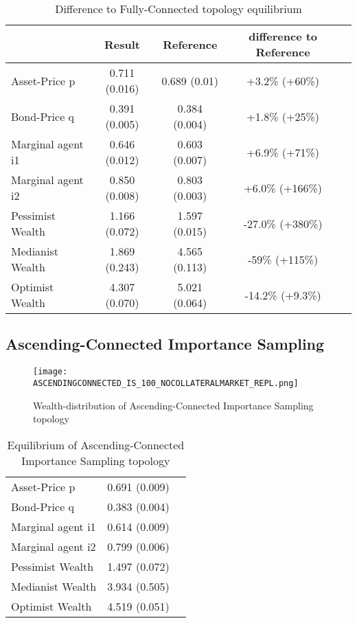 \documentclass[Bachelorarbeit.tex]{subfiles}
\begin{document}
\begin{table}[H]
	\caption{Difference to Fully-Connected topology equilibrium}
	\centering
	\begin{tabular} { l c c c r }
		& Result & Reference & difference to Reference \\
		\hline
		Asset-Price p & 0.711 (0.016) & 0.689 (0.01) & +3.2\% (+60\%) \\
		Bond-Price q & 0.391 (0.005) & 0.384 (0.004) & +1.8\% (+25\%) \\
		Marginal agent i1 & 0.646 (0.012) & 0.603 (0.007) & +6.9\% (+71\%) \\
		Marginal agent i2 & 0.850 (0.008) & 0.803 (0.003) & +6.0\% (+166\%) \\
		\hline
		Pessimist Wealth & 1.166 (0.072) & 1.597 (0.015) & -27.0\% (+380\%) \\
		Medianist Wealth & 1.869 (0.243) & 4.565 (0.113) & -59\% (+115\%) \\
		Optimist Wealth & 4.307 (0.070) & 5.021 (0.064) & -14.2\% (+9.3\%) \\
		\hline
	\end{tabular}
\end{table}

\subsection{Ascending-Connected Importance Sampling}
\begin{figure}[H]
	\centering
  \texttt{[image: ASCENDINGCONNECTED\_IS\_100\_NOCOLLATERALMARKET\_REPL.png]}
	\caption{Wealth-distribution of Ascending-Connected Importance Sampling topology}
	\label{fig:wealth_ASCENDINGCONNECTED_IS_100_NOCOLLATERALMARKET_REPL}
\end{figure}

\begin{table}[H]
	\caption{Equilibrium of Ascending-Connected Importance Sampling topology}
	\centering
	\begin{tabular} { l c r }
		\hline
		Asset-Price p & 0.691 (0.009) \\
		Bond-Price q & 0.383 (0.004) \\
		Marginal agent i1 & 0.614 (0.009) \\
		Marginal agent i2 & 0.799 (0.006) \\
		\hline
		Pessimist Wealth & 1.497 (0.072) \\
		Medianist Wealth & 3.934 (0.505) \\
		Optimist Wealth & 4.519 (0.051) \\
		\hline
	\end{tabular}
\end{table} 
\end{document}
